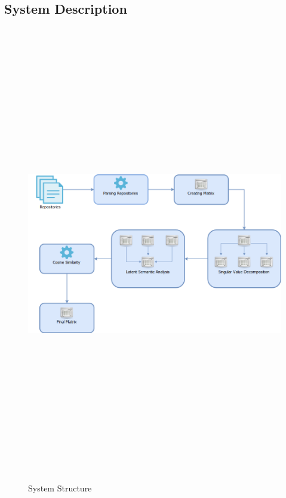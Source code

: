 \subsection{System Description}

\begin{figure}[H]
\includegraphics[width=15cm,height=20cm,keepaspectratio]{images/Architecture.png}
\caption{System Structure}
\end{figure}

